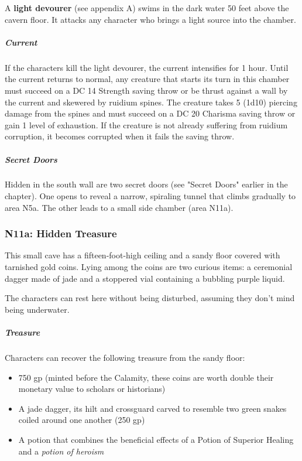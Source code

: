 \documentclass[10pt,a4paper,twoside,fancy,bg=print,twocolumn,openany,nodeprecatedcode]{dndbook}
\begin{document}
A \textbf{light devourer} (see appendix A) swims in the dark water 50 feet above the cavern floor. It attacks any character who brings a light source into the chamber.

\subparagraph{Current}
If the characters kill the light devourer, the current intensifies for 1 hour. Until the current returns to normal, any creature that starts its turn in this chamber must succeed on a DC 14 Strength saving throw or be thrust against a wall by the current and skewered by ruidium spines. The creature takes 5 (1d10) piercing damage from the spines and must succeed on a DC 20 Charisma saving throw or gain 1 level of exhaustion. If the creature is not already suffering from ruidium corruption, it becomes corrupted when it fails the saving throw.

\subparagraph{Secret Doors}
Hidden in the south wall are two secret doors (see "Secret Doors" earlier in the chapter). One opens to reveal a narrow, spiraling tunnel that climbs gradually to area N5a. The other leads to a small side chamber (area N11a).

\subsubsection{N11a: Hidden Treasure}
\begin{DndReadAloud}{}
This small cave has a fifteen-foot-high ceiling and a sandy floor covered with tarnished gold coins. Lying among the coins are two curious items: a ceremonial dagger made of jade and a stoppered vial containing a bubbling purple liquid.

\end{DndReadAloud}

The characters can rest here without being disturbed, assuming they don't mind being underwater.

\subparagraph{Treasure}
Characters can recover the following treasure from the sandy floor:


\begin{itemize}
\item 750 gp (minted before the Calamity, these coins are worth double their monetary value to scholars or historians)
\item A jade dagger, its hilt and crossguard carved to resemble two green snakes coiled around one another (250 gp)
\item A potion that combines the beneficial effects of a Potion of Superior Healing and a \textit{potion of heroism}
\end{itemize}
\end{document}
